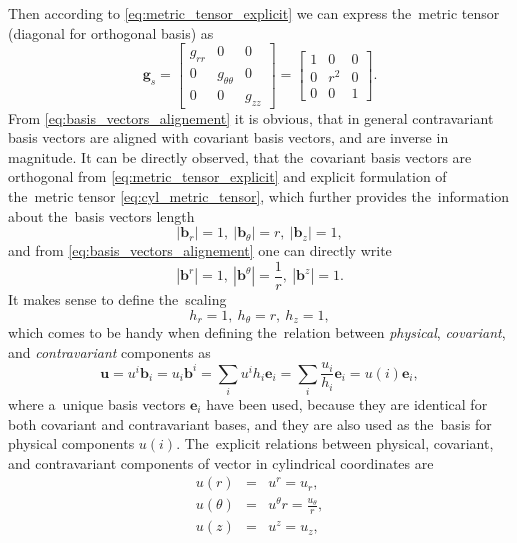 \documentclass[preprint,12pt]{elsarticle}
\newcommand{\vect}[1]{\boldsymbol{#1}}
\newcommand{\matr}[1]{\mathbf{#1}}
\begin{document}
Then according to \eqref{eq:metric_tensor_explicit} we can express the~metric
tensor (diagonal for orthogonal basis) as
\begin{equation}
  \matr{g}_s = \begin{bmatrix}
                 g_{rr} & 0 & 0 \\
			     0 & g_{\theta\theta} & 0 \\
			     0 & 0 & g_{zz}
			   \end{bmatrix}
             = \begin{bmatrix}
                 1 & 0 & 0 \\
			     0 & r^2 & 0 \\
			     0 & 0 & 1
			   \end{bmatrix} .
  \label{eq:cyl_metric_tensor}		   
\end{equation}
From \eqref{eq:basis_vectors_alignement} it is obvious, 
that in general contravariant basis vectors are aligned with covariant basis 
vectors, and are inverse in magnitude.
It can be directly observed, that the~covariant basis vectors are orthogonal
from \eqref{eq:metric_tensor_explicit} and explicit formulation of 
the~metric tensor \eqref{eq:cyl_metric_tensor}, which further provides
the~information about the~basis vectors length
\begin{equation}
  |\vect{b}_r| = 1,~ |\vect{b}_\theta| = r,~ |\vect{b}_z| = 1,
  \nonumber
\end{equation} 
and from \eqref{eq:basis_vectors_alignement} one can directly write
\begin{equation}
  |\vect{b}^r| = 1,~ |\vect{b}^\theta| = \frac{1}{r},~ 
  |\vect{b}^z| = 1.
  \nonumber
\end{equation}
It makes sense to define the~scaling
\begin{equation}
  h_r = 1,~ h_\theta = r,~ h_z = 1,
  \label{eq:cyl_scaling}
\end{equation} 
which comes to be handy when defining the~relation between 
\textit{physical}, \textit{covariant}, and \textit{contravariant} components as
\begin{equation}
  \vect{u} = u^i \vect{b}_i = u_i \vect{b}^i = \sum_i u^i h_i \vect{e}_i
  = \sum_i \frac{u_i}{h_i} \vect{e}_i = u(i) \vect{e}_i,
  \label{eq:cyl_components}
\end{equation}
where a~unique basis vectors $\vect{e}_i$ have been used, because they are 
identical for both covariant and contravariant bases, and they are also used
as the~basis for physical components $u(i)$.
The~explicit relations between physical, covariant, and contravariant components
of vector in cylindrical coordinates are
\begin{eqnarray}
  u(r) &=& u^r = u_r , \nonumber\\
  u(\theta) &=& u^\theta r = \frac{u_\theta}{r} , 
  \nonumber\\
  u(z) &=& u^z = u_z , 
  \label{eq:cyl_physical_components}
\end{eqnarray}
\end{document}

